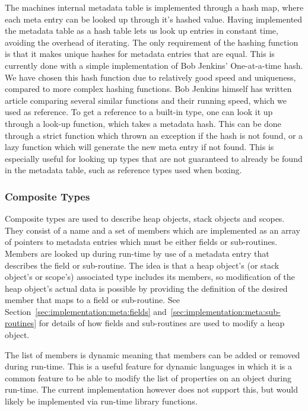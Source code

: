 The machines internal metadata table is implemented through a hash map, where
each meta entry can be looked up through it's hashed value. Having implemented
the metadata table as a hash table lets us look up entries in constant time,
avoiding the overhead of iterating. The only requirement of the hashing function
is that it makes unique hashes for metadata entries that are equal. This is
currently done with a simple implementation of Bob Jenkins' One-at-a-time
hash\cite{jenkins}. We have chosen this hash function due to relatively good
speed and uniqueness, compared to more complex hashing functions. Bob Jenkins
himself has written article comparing several similar functions and their
running speed, which we used as reference\cite{jenkins}. To get a reference to a
built-in type, one can look it up through a look-up function, which takes a
metadata hash. This can be done through a strict function which thrown an
exception if the hash is not found, or a lazy function which will generate the
new meta entry if not found. This is especially useful for looking up types that
are not guaranteed to already be found in the metadata table, such as reference
types used when boxing.

\subsubsection{Composite Types}

Composite types are used to describe heap objects, stack objects and
scopes. They consist of a name and a set of members which are implemented as an
array of pointers to metadata entries which must be either fields or
sub-routines. Members are looked up during run-time by use of a metadata entry
that describes the field or sub-routine. The idea is that a heap object's (or
stack object's or scope's) associated type includes its members, so modification
of the heap object's actual data is possible by providing the definition of the
desired member that maps to a field or sub-routine. See
Section~\ref{sec:implementation:meta:fields}
and~\ref{sec:implementation:meta:sub-routines} for details of how fields and
sub-routines are used to modify a heap object.

The list of members is dynamic meaning that members can be added or removed
during run-time. This is a useful feature for dynamic languages in which it is a
common feature to be able to modify the list of properties on an object during
run-time. The current implementation however does not support this, but would
likely be implemented via run-time library functions.

